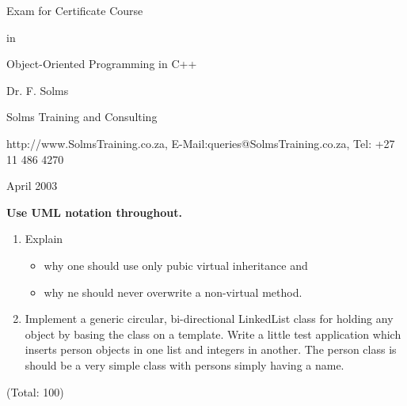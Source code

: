 \documentclass[a4paper,11pt]{article}
\begin{document}
\centerline{\Large Exam for Certificate Course}

\vspace{3mm}

\centerline{\Large in}

\vspace{3mm}

\centerline{\Huge Object-Oriented Programming in C++}

\vspace{6mm}

\centerline{\large Dr. F. Solms}
\centerline{\large Solms Training and Consulting}
\centerline{\large http://www.SolmsTraining.co.za, E-Mail:queries@SolmsTraining.co.za, Tel: +27 11 486 4270}

\vspace{4mm}

\centerline{\large April 2003}

\vspace{8mm}

\centerline{\bf \large Use UML notation throughout.}

\vspace{8mm}

\begin{enumerate}

  \item Explain
	     \begin{itemize}
         \item why one should use only pubic virtual inheritance and
         \item why ne should never overwrite a non-virtual method.
			 \end{itemize}

  \item Implement a generic circular, bi-directional LinkedList class for holding any object
       by basing the class on a template. Write a little test application which inserts
			 person objects in one list and integers in another. The person class is should be a
			 very simple class with persons simply having a name.


\end{enumerate}
\vspace{10mm}
\centerline{\large (Total: 100)}
\end{document}
